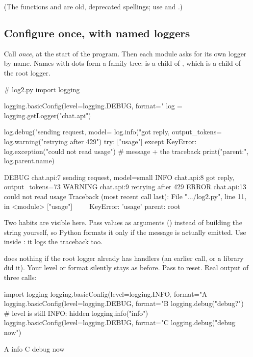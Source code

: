 (The functions  and  are old, deprecated spellings; use  and .)

\subsection{Configure once, with named loggers}

Call  \emph{once}, at the start of the program. Then each module asks for its own logger by name.
Names with dots form a family tree:  is a child of , which is a child of the root logger.

\begin{pycode}
# log2.py
import logging

logging.basicConfig(level=logging.DEBUG,
                    format="%
log = logging.getLogger("chat.api")

log.debug("sending request, model=%
log.info("got reply, output_tokens=%
log.warning("retrying after 429")
try:
    {}["usage"]
except KeyError:
    log.exception("could not read usage")     # message + the traceback
print("parent:", log.parent.name)
\end{pycode}
\begin{rawcode}
DEBUG    chat.api:7 sending request, model=small
INFO     chat.api:8 got reply, output_tokens=73
WARNING  chat.api:9 retrying after 429
ERROR    chat.api:13 could not read usage
Traceback (most recent call last):
  File ".../log2.py", line 11, in <module>
    {}["usage"]
    ~~^^^^^^^^^
KeyError: 'usage'
parent: root
\end{rawcode}

Two habits are visible here. Pass values as arguments () instead of building the string yourself, so
Python formats it only if the message is actually emitted. Use  inside : it logs the traceback too.

\begin{trap}
 does nothing if the root logger already has handlers (an earlier call, or a library did it). Your level or format
silently stays as before. Pass  to reset. Real output of three calls:
\begin{pycode}
import logging
logging.basicConfig(level=logging.INFO, format="A %
logging.basicConfig(level=logging.DEBUG, format="B %
logging.debug("debug?")                  # level is still INFO: hidden
logging.info("info")
logging.basicConfig(level=logging.DEBUG, format="C %
logging.debug("debug now")
\end{pycode}
\begin{rawcode}
A info
C debug now
\end{rawcode}
\end{trap}

